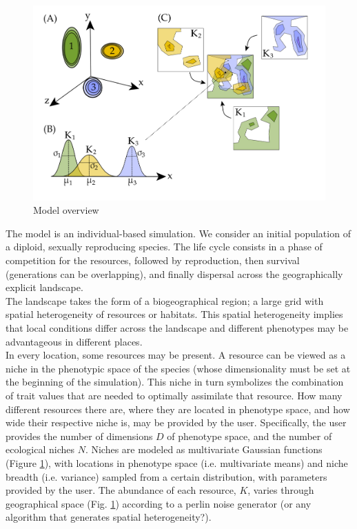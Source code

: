 \documentclass[]{article}
\begin{document}
\begin{figure}
	\includegraphics[width=\textwidth]{./figures/model_overview/model.png}
	\caption{Model overview}
	\label{fig:overview}
\end{figure}

The model is an individual-based simulation. We consider an initial population of a diploid, sexually reproducing species. The life cycle consists in a phase of competition for the resources, followed by reproduction, then survival (generations can be overlapping), and finally dispersal across the geographically explicit landscape.\\

The landscape takes the form of a biogeographical region; a large grid with spatial heterogeneity of resources or habitats. This spatial heterogeneity implies that local conditions differ across the landscape and different phenotypes may be advantageous in different places.\\

In every location, some resources may be present. A resource can be viewed as a niche in the phenotypic space of the species (whose dimensionality must be set at the beginning of the simulation). This niche in turn symbolizes the combination of trait values that are needed to optimally assimilate that resource. How many different resources there are, where they are located in phenotype space, and how wide their respective niche is, may be provided by the user. Specifically, the user provides the number of dimensions $D$ of phenotype space, and the number of ecological niches $N$. Niches are modeled as multivariate Gaussian functions (Figure \ref{fig:overview}), with locations in phenotype space (i.e. multivariate means) and niche breadth (i.e. variance) sampled from a certain distribution, with parameters provided by the user. The abundance of each resource, $K$, varies through geographical space (Fig. \ref{fig:overview}) according to a perlin noise generator (or any algorithm that generates spatial heterogeneity?).\\
\end{document}
